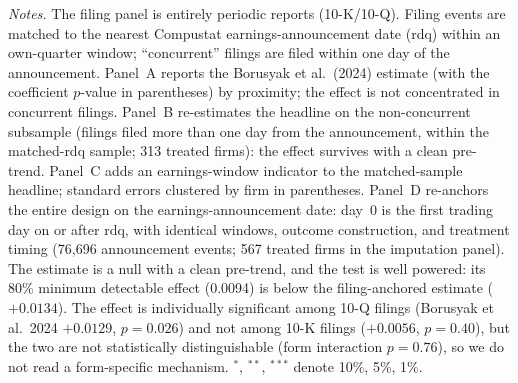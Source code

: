 \begin{table}[t]
\begin{threeparttable}
\begin{tablenotes}
\item \textit{Notes.} The filing panel is entirely periodic reports (10-K/10-Q). Filing events are matched to the nearest Compustat earnings-announcement date (rdq) within an own-quarter window; ``concurrent'' filings are filed within one day of the announcement. Panel~A reports the Borusyak et al.\ (2024) estimate (with the coefficient $p$-value in parentheses) by proximity; the effect is not concentrated in concurrent filings. Panel~B re-estimates the headline on the non-concurrent subsample (filings filed more than one day from the announcement, within the matched-rdq sample; 313 treated firms): the effect survives with a clean pre-trend. Panel~C adds an earnings-window indicator to the matched-sample headline; standard errors clustered by firm in parentheses. Panel~D re-anchors the entire design on the earnings-announcement date: day~0 is the first trading day on or after rdq, with identical windows, outcome construction, and treatment timing (76{,}696 announcement events; 567 treated firms in the imputation panel). The estimate is a null with a clean pre-trend, and the test is well powered: its 80\% minimum detectable effect (0.0094) is below the filing-anchored estimate ($+0.0134$). The effect is individually significant among 10-Q filings (Borusyak et al.\ 2024 $+0.0129$, $p=0.026$) and not among 10-K filings ($+0.0056$, $p=0.40$), but the two are not statistically distinguishable (form interaction $p=0.76$), so we do not read a form-specific mechanism. $^{*}$, $^{**}$, $^{***}$ denote 10\%, 5\%, 1\%.
\end{tablenotes}
\end{threeparttable}
\end{table}
